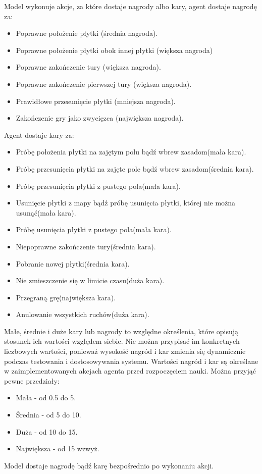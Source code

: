 \documentclass[a4paper,twoside,12pt]{book}
\begin{document}
	
		Model wykonuje akcje, za które dostaje nagrody albo kary, agent dostaje nagrodę za:
	\begin{itemize}
		\item Poprawne położenie płytki (średnia nagroda).
		\item Poprawne położenie płytki obok innej płytki (większa nagroda)
		\item Poprawne zakończenie tury (większa nagroda).
		\item Poprawne zakończenie pierwszej tury (większa nagroda).
		\item Prawidłowe przesunięcie płytki (mniejsza nagroda).
		\item Zakończenie gry jako zwycięzca (największa nagroda).
	\end{itemize}
	Agent dostaje kary za:
	\begin{itemize}
		\item Próbę położenia płytki na zajętym polu bądź wbrew zasadom(mała kara).
		\item Próbę przesunięcia płytki na zajęte pole bądź wbrew zasadom(średnia kara).
		\item Próbę przesunięcia płytki z pustego pola(mała kara).
		\item Usunięcie płytki z mapy bądź próbę usunięcia płytki, której nie można usunąć(mała kara).
		\item Próbę usunięcia płytki z pustego pola(mała kara).
		\item Niepoprawne zakończenie tury(średnia kara).
		\item Pobranie nowej płytki(średnia kara).
		\item Nie zmieszczenie się w limicie czasu(duża kara).
		\item Przegraną grę(największa kara).
		\item Anulowanie wszystkich ruchów(duża kara).
	\end{itemize}
		Małe, średnie i duże kary lub nagrody to względne określenia, które opisują stosunek ich wartości względem siebie. Nie można przypisać im konkretnych liczbowych wartości, ponieważ wysokość nagród i kar zmienia się dynamicznie podczas testowania i dostosowywania systemu. Wartości nagród i kar są określane w zaimplementowanych akcjach agenta przed rozpoczęciem nauki. Można przyjąć pewne przedziały:
	\begin{itemize}
		\item Mała - od 0.5 do 5.
		\item Średnia - od 5 do 10.
		\item Duża - od 10 do 15.
		\item Największa - od 15 wzwyż.
	\end{itemize}
		Model dostaje nagrodę bądź karę bezpośrednio po wykonaniu akcji.
		
\end{document}
